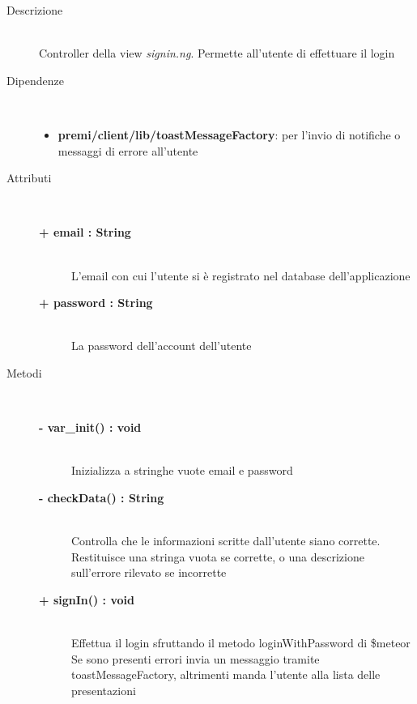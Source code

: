 \begin{description}
\item[Descrizione] \hfill \\
	Controller della view \textit{signin.ng}. Permette all'utente di effettuare il login
	
	
	
\item[Dipendenze] \hfill \\
	\begin{itemize}
		\item \textbf{premi/client/lib/toastMessageFactory}: per l'invio di notifiche o messaggi di errore all'utente
	\end{itemize}
	
	
\item[Attributi] \hfill \\
	\begin{description}
		\item[\textbf{+ email : String			}] \hfill \\
			L'email con cui l'utente si è registrato nel database dell'applicazione
		\item[\textbf{+ password : String			}] \hfill \\
			La password dell'account dell'utente
	\end{description}
	
	
\item[Metodi] \hfill \\

	\begin{description}
		\item[\textbf{\color{blue}- var\_init() : void			}] \hfill \\
			Inizializza a stringhe vuote email e password
	\end{description}
	
	\begin{description}
		\item[\textbf{\color{blue}- checkData() : String			}] \hfill \\
			Controlla che le informazioni scritte dall'utente siano corrette. Restituisce una stringa vuota se corrette, o una descrizione sull'errore rilevato se incorrette
	\end{description}
	
	\begin{description}
		\item[\textbf{\color{blue}+ signIn() : void			}] \hfill \\
			Effettua il login sfruttando il metodo loginWithPassword di \$meteor
			Se sono presenti errori invia un messaggio tramite toastMessageFactory, altrimenti manda l'utente alla lista delle presentazioni
	\end{description}

\end{description}



